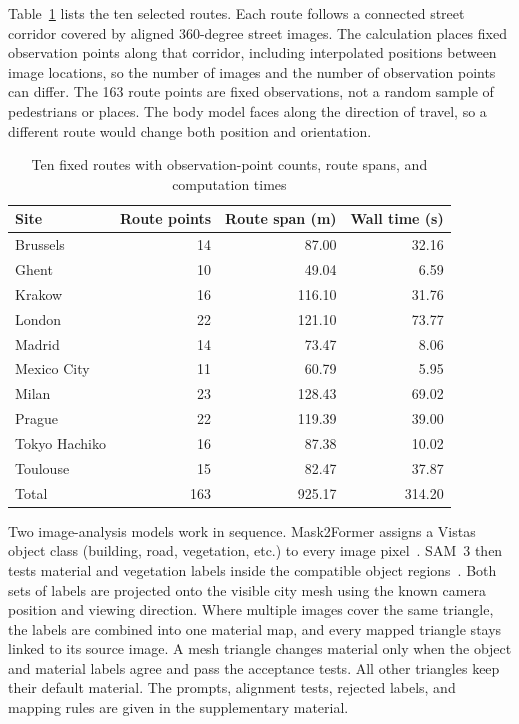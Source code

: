 \documentclass{ieeeaccess}
\begin{document}
Table~\ref{tab:routes} lists the ten selected routes. Each route follows a
connected street corridor covered by aligned 360-degree street images. The
calculation places fixed observation points along that corridor, including
interpolated positions between image locations, so the number of images and
the number of observation points can differ. The 163 route points are fixed
observations, not a random sample of pedestrians or places. The body model
faces along the direction of travel, so a different route would change both
position and orientation.

\begin{table}[!t]
  \caption{Ten fixed routes with observation-point counts, route spans, and computation times}
  \label{tab:routes}
  \centering
  \begin{tabular}{lrrr}
    \toprule
    Site & Route points & Route span (m) & Wall time (s) \\
    \midrule
    Brussels & 14 & 87.00 & 32.16 \\
    Ghent & 10 & 49.04 & 6.59 \\
    Krakow & 16 & 116.10 & 31.76 \\
    London & 22 & 121.10 & 73.77 \\
    Madrid & 14 & 73.47 & 8.06 \\
    Mexico City & 11 & 60.79 & 5.95 \\
    Milan & 23 & 128.43 & 69.02 \\
    Prague & 22 & 119.39 & 39.00 \\
    Tokyo Hachiko & 16 & 87.38 & 10.02 \\
    Toulouse & 15 & 82.47 & 37.87 \\
    \midrule
    Total & 163 & 925.17 & 314.20 \\
    \bottomrule
  \end{tabular}
\end{table}

Two image-analysis models work in sequence. Mask2Former assigns a Vistas object
class (building, road, vegetation, etc.) to every image
pixel~\cite{mask2former,vistas}. SAM~3 then tests material and vegetation labels
inside the compatible object regions~\cite{sam3}. Both sets of labels are
projected onto the visible city mesh using the known camera position and viewing
direction. Where multiple images cover the same triangle, the labels are
combined into one material map, and every mapped triangle stays linked to its
source image. A mesh triangle changes material only when the object and
material labels agree and pass the acceptance tests. All other triangles keep
their default material. The prompts, alignment tests, rejected labels, and
mapping rules are given in the supplementary material.
\end{document}
